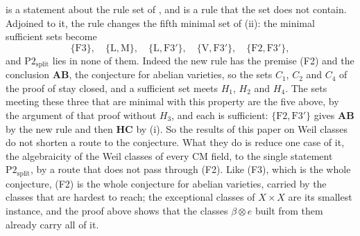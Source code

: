 \begin{remark}\label{rem:f2rule}
 is a statement about the rule set of ,
and  is a rule that the set does not contain. Adjoined to
it, the rule changes the fifth minimal set of (ii): the
minimal sufficient sets become
\[
  \{\mathrm{F3}\},\quad\{\mathrm{L},\mathrm{M}\},\quad
  \{\mathrm{L},\mathrm{F3}'\},\quad\{\mathrm{V},\mathrm{F3}'\},\quad
  \{\mathrm{F2},\mathrm{F3}'\},
\]
and $\mathrm{P2}_{\mathrm{split}}$ lies in none of them. Indeed the new rule
has the premise (F2) and the conclusion $\mathbf{AB}$, the conjecture for
abelian varieties, so the sets $C_{1}$, $C_{2}$ and $C_{4}$ of the proof of
 stay closed, and a sufficient set meets $H_{1}$, $H_{2}$
and $H_{4}$. The sets meeting these three that are minimal with this property
are the five above, by the argument of that proof without $H_{3}$, and each is
sufficient: $\{\mathrm{F2},\mathrm{F3}'\}$ gives $\mathbf{AB}$ by the new
rule and then $\mathbf{HC}$ by (i). So the results of this
paper on Weil classes do not shorten a route to the conjecture. What they do
is reduce one case of it, the algebraicity of the Weil classes of every CM
field, to the single statement $\mathrm{P2}_{\mathrm{split}}$, by a route that
does not pass through (F2). Like (F3), which is the whole conjecture, (F2) is
the whole conjecture for abelian varieties, carried by the classes that are
hardest to reach; the exceptional classes of $X\times X$ are its smallest
instance, and the proof above shows that the classes $\beta\otimes e$ built
from them already carry all of it.
\end{remark}
